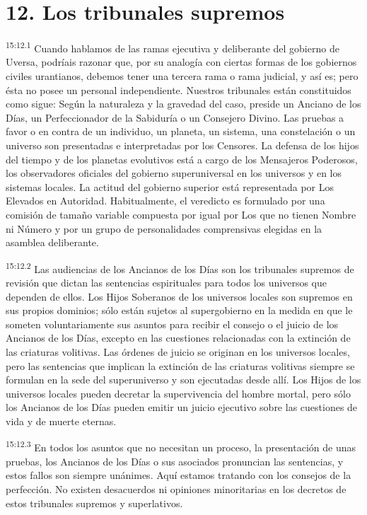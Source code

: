 \section*{12. Los tribunales supremos}
\par
\textsuperscript{15:12.1} Cuando hablamos de las ramas ejecutiva y deliberante del gobierno de Uversa, podríais razonar que, por su analogía con ciertas formas de los gobiernos civiles urantianos, debemos tener una tercera rama o rama judicial, y así es; pero ésta no posee un personal independiente. Nuestros tribunales están constituidos como sigue: Según la naturaleza y la gravedad del caso, preside un Anciano de los Días, un Perfeccionador de la Sabiduría o un Consejero Divino. Las pruebas a favor o en contra de un individuo, un planeta, un sistema, una constelación o un universo son presentadas e interpretadas por los Censores. La defensa de los hijos del tiempo y de los planetas evolutivos está a cargo de los Mensajeros Poderosos, los observadores oficiales del gobierno superuniversal en los universos y en los sistemas locales. La actitud del gobierno superior está representada por Los Elevados en Autoridad. Habitualmente, el veredicto es formulado por una comisión de tamaño variable compuesta por igual por Los que no tienen Nombre ni Número y por un grupo de personalidades comprensivas elegidas en la asamblea deliberante.

\par
\textsuperscript{15:12.2} Las audiencias de los Ancianos de los Días son los tribunales supremos de revisión que dictan las sentencias espirituales para todos los universos que dependen de ellos. Los Hijos Soberanos de los universos locales son supremos en sus propios dominios; sólo están sujetos al supergobierno en la medida en que le someten voluntariamente sus asuntos para recibir el consejo o el juicio de los Ancianos de los Días, excepto en las cuestiones relacionadas con la extinción de las criaturas volitivas. Las órdenes de juicio se originan en los universos locales, pero las sentencias que implican la extinción de las criaturas volitivas siempre se formulan en la sede del superuniverso y son ejecutadas desde allí. Los Hijos de los universos locales pueden decretar la supervivencia del hombre mortal, pero sólo los Ancianos de los Días pueden emitir un juicio ejecutivo sobre las cuestiones de vida y de muerte eternas.

\par
\textsuperscript{15:12.3} En todos los asuntos que no necesitan un proceso, la presentación de unas pruebas, los Ancianos de los Días o sus asociados pronuncian las sentencias, y estos fallos son siempre unánimes. Aquí estamos tratando con los consejos de la perfección. No existen desacuerdos ni opiniones minoritarias en los decretos de estos tribunales supremos y superlativos.


